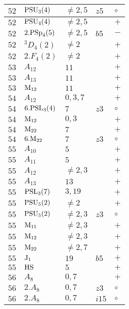 \documentclass[a4paper, 11pt]{article}
\begin{document}
\begin{longtable}{lllll}
		$52$ & ${\rm PSU}_{3}(4)$ & $\neq 2,5$ & $z5$ & $\circ$ \\ \hline
		$52$ & ${\rm PSU}_{4}(4)$ & $\neq 2,5$ &  & $+$ \\ \hline
		$52$ & $2.{\rm PSp}_{4}(5)$ & $\neq 2,5$ & $b5$ & $-$ \\ \hline
		$52$ & ${}^{3}D_{4}(2)$ & $\neq 2$ &  & $+$ \\ \hline
		$52$ & $2.F_{4}(2)$ & $\neq 2$ &  & $+$ \\ \hline
		$53$ & $A_{12}$ & $11$ &  & $+$ \\ \hline
		$53$ & $A_{13}$ & $11$ &  & $+$ \\ \hline
		$53$ & ${\rm M}_{12}$ & $11$ &  & $+$ \\ \hline
		$54$ & $A_{12}$ & $0,3,7$ &  & $+$ \\ \hline
		$54$ & $6.{\rm PSL}_{3}(4)$ & $7$ & $z3$ & $\circ$ \\ \hline
		$54$ & ${\rm M}_{12}$ & $0,3$ &  & $+$ \\ \hline
		$54$ & ${\rm M}_{22}$ & $7$ &  & $+$ \\ \hline
		$54$ & $6.{\rm M}_{22}$ & $7$ & $z3$ & $\circ$ \\ \hline
		$55$ & $A_{10}$ & $5$ &  & $+$ \\ \hline
		$55$ & $A_{11}$ & $5$ &  & $+$ \\ \hline
		$55$ & $A_{12}$ & $\neq 2,3$ &  & $+$ \\ \hline
		$55$ & $A_{13}$ & $13$ &  & $+$ \\ \hline
		$55$ & ${\rm PSL}_{3}(7)$ & $3,19$ &  & $+$ \\ \hline
		$55$ & ${\rm PSU}_{5}(2)$ & $\neq 2$ &  & $+$ \\ \hline
		$55$ & ${\rm PSU}_{5}(2)$ & $\neq 2,3$ & $z3$ & $\circ$ \\ \hline
		$55$ & ${\rm M}_{11}$ & $\neq 2,3$ &  & $+$ \\ \hline
		$55$ & ${\rm M}_{12}$ & $\neq 2,3$ &  & $+$ \\ \hline
		$55$ & ${\rm M}_{22}$ & $\neq 2,7$ &  & $+$ \\ \hline
		$55$ & ${\rm J}_1$ & $19$ & $b5$ & $+$ \\ \hline
		$55$ & ${\rm HS}$ & $5$ &  & $+$ \\ \hline
		$56$ & $A_{8}$ & $0,7$ &  & $+$ \\ \hline
		$56$ & $2.A_{8}$ & $0,7$ & $z3$ & $\circ$ \\ \hline
		$56$ & $2.A_{8}$ & $0,7$ & $i15$ & $\circ$ \\ \hline

\end{longtable}
\end{document}
